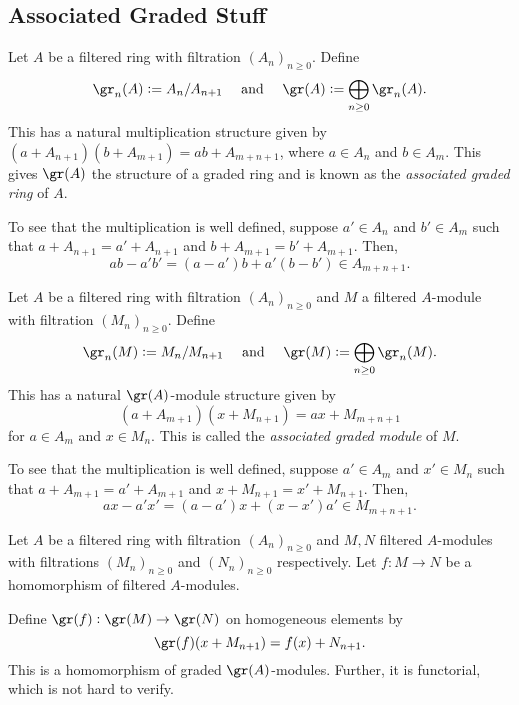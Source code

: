 \subsection{Associated Graded Stuff}

\begin{definition}
    Let $A$ be a filtered ring with filtration $(A_n)_{n\ge0}$. Define 
    \begin{equation*}
        \gr_n(A) := A_n/A_{n + 1}\quad\text{ and }\quad\gr(A) := \bigoplus_{n\ge 0}\gr_n(A).
    \end{equation*}
    This has a natural multiplication structure given by $(a + A_{n + 1})(b + A_{m + 1}) = ab + A_{m + n + 1}$, where $a\in A_n$ and $b\in A_m$. This gives $\gr(A)$ the structure of a graded ring and is known as the \emph{associated graded ring} of $A$.
\end{definition}

To see that the multiplication is well defined, suppose $a'\in A_n$ and $b'\in A_m$ such that $a + A_{n + 1} = a' + A_{n + 1}$ and $b + A_{m + 1} = b' + A_{m + 1}$. Then, 
\begin{equation*}
    ab - a'b' = (a - a')b + a'(b - b')\in A_{m + n + 1}.
\end{equation*}

\begin{definition}
    Let $A$ be a filtered ring with filtration $(A_n)_{n\ge 0}$ and $M$ a filtered $A$-module with filtration $(M_n)_{n\ge 0}$. Define 
    \begin{equation*}
        \gr_n(M) := M_n/M_{n + 1}\quad\text{ and }\quad\gr(M) := \bigoplus_{n\ge 0}\gr_n(M).
    \end{equation*}
    This has a natural $\gr(A)$-module structure given by 
    \begin{equation*}
        (a + A_{m + 1})(x + M_{n + 1}) = ax + M_{m + n + 1}
    \end{equation*}
    for $a\in A_m$ and $x\in M_n$. This is called the \emph{associated graded module} of $M$.
\end{definition}

To see that the multiplication is well defined, suppose $a'\in A_m$ and $x'\in M_n$ such that $a + A_{m + 1} = a' + A_{m + 1}$ and $x + M_{n + 1} = x' + M_{n + 1}$. Then, 
\begin{equation*}
    ax - a'x' = (a - a')x + (x - x')a'\in M_{m + n + 1}.
\end{equation*}

\begin{definition}[Functoriality of $\gr$]
    Let $A$ be a filtered ring with filtration $(A_n)_{n\ge 0}$ and $M, N$ filtered $A$-modules with filtrations $(M_n)_{n\ge 0}$ and $(N_n)_{n\ge 0}$ respectively. Let $f: M\to N$ be a homomorphism of filtered $A$-modules. 

    Define $\gr(f):\gr(M)\to\gr(N)$ on homogeneous elements by 
    \begin{equation*}
        \gr(f)(x + M_{n + 1}) = f(x) + N_{n + 1}.
    \end{equation*}
    This is a homomorphism of graded $\gr(A)$-modules. Further, it is functorial, which is not hard to verify.
\end{definition}


